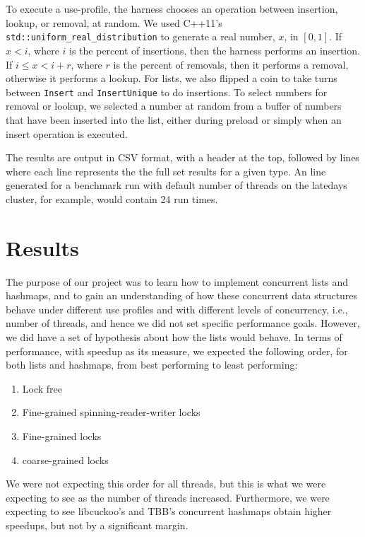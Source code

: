 \documentclass[11pt]{article}
\begin{document}
To execute a use-profile, the harness chooses an operation between insertion,
lookup, or removal, at random. We used C++11's {\tt
std::uniform\_real\_distribution} to generate a real number, $x$, in $[0,1]$. If
$x < i$, where $i$ is the percent of insertions, then the harness performs an
insertion. If $i \le x < i + r$, where $r$ is the percent of removals, then it
performs a removal, otherwise it performs a lookup. For lists, we also flipped a
coin to take turns between {\tt Insert} and {\tt InsertUnique} to do insertions.
To select numbers for removal or lookup, we selected a number at random from a
buffer of numbers that have been inserted into the list, either during preload
or simply when an insert operation is executed.

The results are output in CSV format, with a header at the top, followed by
lines where each line represents the the full set results for a given type. An
line generated for a benchmark run with default number of threads on the
latedays cluster, for example, would contain 24 run times.

\section{Results}
The purpose of our project was to learn how to implement concurrent lists and
hashmaps, and to gain an understanding of how these concurrent data structures
behave under different use profiles and with different levels of concurrency,
i.e., number of threads, and hence we did not set specific performance goals.
However, we did have a set of hypothesis about how the lists would behave. In
terms of performance, with speedup as its measure, we expected the following
order, for both lists and hashmaps, from best performing to least performing:

\begin{enumerate}
\item Lock free
\item Fine-grained spinning-reader-writer locks
\item Fine-grained locks
\item coarse-grained locks
\end{enumerate}

We were not expecting this order for all threads, but this is what we were
expecting to see as the number of threads increased. Furthermore, we were
expecting to see libcuckoo's and TBB's concurrent hashmaps obtain higher
speedups, but not by a significant margin.
\end{document}
